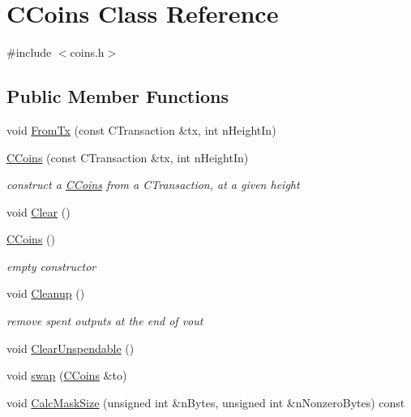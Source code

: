 \hypertarget{class_c_coins}{}\section{C\+Coins Class Reference}
\label{class_c_coins}


{\ttfamily \#include $<$coins.\+h$>$}

\subsection*{Public Member Functions}
\begin{DoxyCompactItemize}
\item 
void \mbox{\hyperlink{class_c_coins_abf67e501a1d207c892c1f52dd383956e}{From\+Tx}} (const C\+Transaction \&tx, int n\+Height\+In)
\item 
\mbox{\hyperlink{class_c_coins_a303f3b245c339c11a1ea4318b01ec290}{C\+Coins}} (const C\+Transaction \&tx, int n\+Height\+In)
\begin{DoxyCompactList}\small\item\em construct a \mbox{\hyperlink{class_c_coins}{C\+Coins}} from a C\+Transaction, at a given height \end{DoxyCompactList}\item 
void \mbox{\hyperlink{class_c_coins_a4d4197688436b752234bea95f0230b82}{Clear}} ()
\item 
\mbox{\hyperlink{class_c_coins_a543757065d6c77d23953a33eecb31a46}{C\+Coins}} ()
\begin{DoxyCompactList}\small\item\em empty constructor \end{DoxyCompactList}\item 
void \mbox{\hyperlink{class_c_coins_a7cfa2efc07f4d35785c9c75caa8bddcb}{Cleanup}} ()
\begin{DoxyCompactList}\small\item\em remove spent outputs at the end of vout \end{DoxyCompactList}\item 
void \mbox{\hyperlink{class_c_coins_ad8b649abb32bdba255adec6dcfd57fc5}{Clear\+Unspendable}} ()
\item 
void \mbox{\hyperlink{class_c_coins_a9581324a74e9500b3d2cad472c0a830f}{swap}} (\mbox{\hyperlink{class_c_coins}{C\+Coins}} \&to)
\item 
void \mbox{\hyperlink{class_c_coins_a7fc7a42f2b5d7cf7476bfe3e10141e18}{Calc\+Mask\+Size}} (unsigned int \&n\+Bytes, unsigned int \&n\+Nonzero\+Bytes) const

\end{DoxyCompactItemize}
